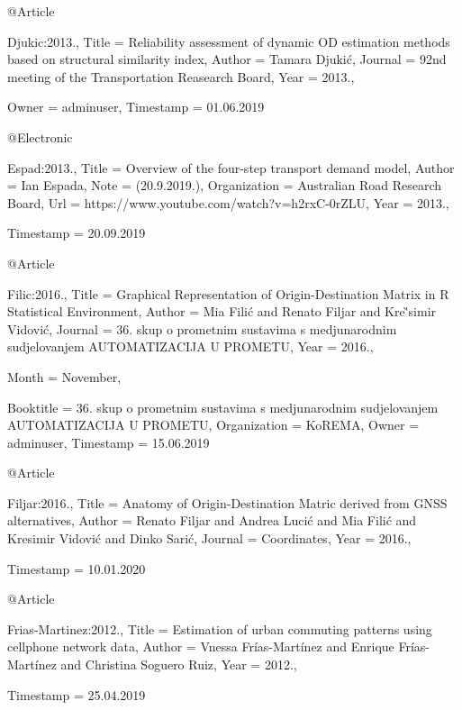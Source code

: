{@Article{Djukic:2013.,
  Title                    = {Reliability assessment of dynamic {OD} estimation methods based on structural similarity index},
  Author                   = {Tamara Djuki\'c},
  Journal                  = {92nd meeting of the Transportation Reasearch Board},
  Year                     = {2013.},

  Owner                    = {adminuser},
  Timestamp                = {01.06.2019}
}

@Electronic{Espad:2013.,
  Title                    = {Overview of the four-step transport demand model},
  Author                   = {Ian Espada},
  Note                     = {(20.9.2019.)},
  Organization             = {Australian Road Research Board},
  Url                      = {https://www.youtube.com/watch?v=h2rxC-0rZLU},
  Year                     = {2013.},

  Timestamp                = {20.09.2019}
}

@Article{Filic:2016.,
  Title                    = {{Graphical Representation of Origin-Destination Matrix in R Statistical Environment}},
  Author                   = {Mia Fili\'c and Renato Filjar and Kre\`'simir Vidovi\'c},
  Journal                  = {36. skup o prometnim sustavima s medjunarodnim sudjelovanjem AUTOMATIZACIJA U PROMETU},
  Year                     = {2016.},

  Month                    = {November},

  Booktitle                = {36. skup o prometnim sustavima s medjunarodnim sudjelovanjem AUTOMATIZACIJA U PROMETU},
  Organization             = {KoREMA},
  Owner                    = {adminuser},
  Timestamp                = {15.06.2019}
}

@Article{Filjar:2016.,
  Title                    = {{Anatomy of Origin-Destination Matric derived from GNSS alternatives}},
  Author                   = {Renato Filjar and Andrea Luci\'c and Mia Fili\'c and Kresimir Vidovi\'c and Dinko Sari\'c},
  Journal                  = {Coordinates},
  Year                     = {2016.},

  Timestamp                = {10.01.2020}
}

@Article{Frias-Martinez:2012.,
  Title                    = {Estimation of urban commuting patterns using cellphone network data},
  Author                   = {Vnessa Fr\'ias-Mart\'inez and Enrique Fr\'ias-Mart\'inez and Christina Soguero Ruiz},
  Year                     = {2012.},

  Timestamp                = {25.04.2019}
}

}
